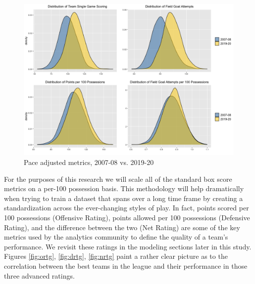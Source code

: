\documentclass [MS] {uclathes}
\begin{document}
\begin{figure}[h]
\centering
  \includegraphics[width=500px]{pace_adjust_hist.png}
  \caption{Pace adjusted metrics, 2007-08 vs. 2019-20}
  \label{fig:paceadjust}
\end{figure}

For the purposes of this research we will scale all of the standard box score metrics on a per-100 possession basis. This methodology will help dramatically when trying to train a dataset that spans over a long time frame by creating a standardization across the ever-changing styles of play. In fact, points scored per 100 possessions (Offensive Rating), points allowed per 100 possessions (Defensive Rating), and the difference between the two (Net Rating) are some of the key metrics used by the analytics community to define the quality of a team's performance. We revisit these ratings in the modeling sections later in this study. Figures \ref{fig:ortg}, \ref{fig:drtg}, \ref{fig:nrtg} paint a rather clear picture as to the correlation between the best teams in the league and their performance in those three advanced ratings. 
\end{document}
